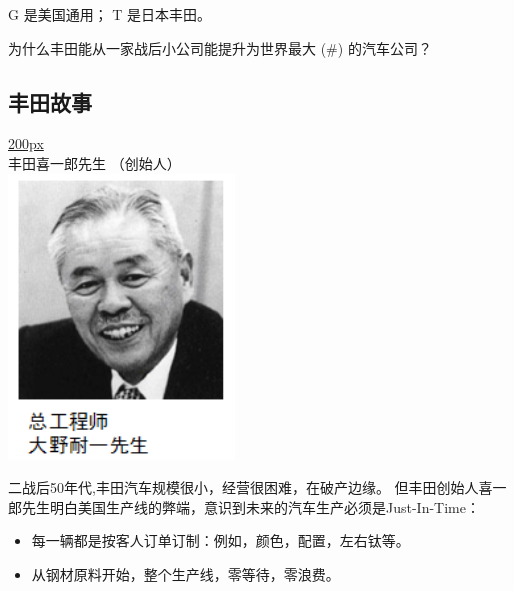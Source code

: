 G 是美国通用； T 是日本丰田。

为什么丰田能从一家战后小公司能提升为世界最大 (\#) 的汽车公司？

\begin{description}
\item[]
\end{description}

\hypertarget{ux4e30ux7530ux6545ux4e8b}{%
\subsection{丰田故事}\label{ux4e30ux7530ux6545ux4e8b}}

\href{文件:ToyotaPresidentPicture1.png}{200px}\\
丰田喜一郎先生 （创始人）\\

\includegraphics[width=6cm]{大野耐一.png}

二战后50年代,丰田汽车规模很小，经营很困难，在破产边缘。
但丰田创始人喜一郎先生明白美国生产线的弊端，意识到未来的汽车生产必须是Just-In-Time：

\begin{itemize}
\tightlist
\item
  每一辆都是按客人订单订制：例如，颜色，配置，左右钛等。
\item
  从钢材原料开始，整个生产线，零等待，零浪费。
\end{itemize}

\begin{description}
\item[]
\end{description}

